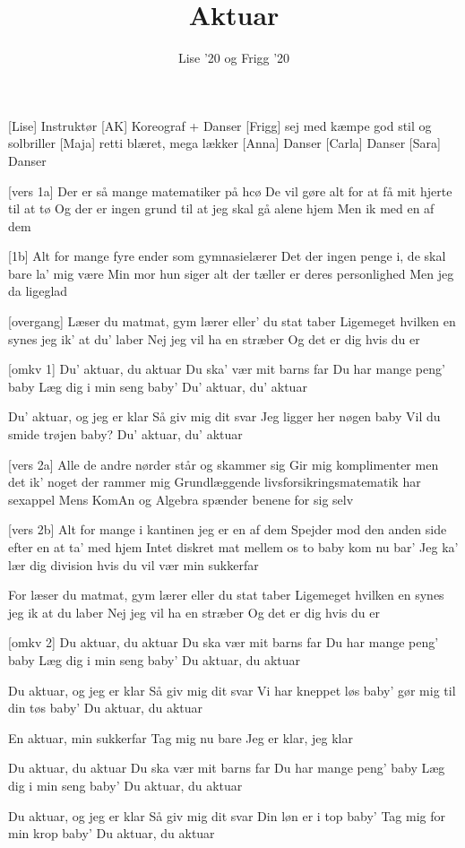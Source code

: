 \documentclass[a4paper,11pt]{article}
\title{Aktuar}
\author{Lise '20 og Frigg '20}
\begin{document}
\maketitle

\begin{roles}
[Lise] Instruktør
[AK] Koreograf + Danser
[Frigg] sej med kæmpe god stil og solbriller
[Maja] retti blæret, mega lækker
[Anna] Danser
[Carla] Danser
[Sara] Danser
\end{roles}



\begin{song}
[vers 1a]
Der er så mange matematiker på hcø
De vil gøre alt for at få mit hjerte til at tø
Og der er ingen grund til at jeg skal gå alene hjem
Men ik med en af dem

[1b]
Alt for mange fyre ender som gymnasielærer
Det der ingen penge i, de skal bare la’ mig være
Min mor hun siger alt der tæller er deres personlighed
Men jeg da ligeglad

[overgang]
Læser du matmat, gym lærer eller’ du stat taber
Ligemeget hvilken en synes jeg ik’ at du’ laber
Nej jeg vil ha en stræber
Og det er dig hvis du er

[omkv 1]
Du’ aktuar, du aktuar
Du ska’ vær mit barns far
Du har mange peng’ baby
Læg dig i min seng baby’
Du’ aktuar, du’ aktuar

Du’ aktuar, og jeg er klar
Så giv mig dit svar
Jeg ligger her nøgen baby
Vil du smide trøjen baby?
Du’ aktuar, du’ aktuar

[vers 2a]
Alle de andre nørder står og skammer sig
Gir mig komplimenter men det ik’ noget der rammer mig
Grundlæggende livsforsikringsmatematik har sexappel
Mens KomAn og Algebra spænder benene for sig selv

[vers 2b]
Alt for mange i kantinen jeg er en af dem
Spejder mod den anden side efter en at ta’ med hjem
Intet diskret mat mellem os to baby kom nu bar’
Jeg ka’ lær dig division hvis du vil vær min sukkerfar

For læser du matmat, gym lærer eller du stat taber
Ligemeget hvilken en synes jeg ik at du laber
Nej jeg vil ha en stræber
Og det er dig hvis du er

[omkv 2]
Du aktuar, du aktuar
Du ska vær mit barns far
Du har mange peng’ baby
Læg dig i min seng baby’
Du aktuar, du aktuar

Du aktuar, og jeg er klar
Så giv mig dit svar
Vi har kneppet løs baby’
gør mig til din tøs baby’
Du aktuar, du aktuar

En aktuar, min sukkerfar
Tag mig nu bare
Jeg er klar, jeg klar

Du aktuar, du aktuar
Du ska vær mit barns far
Du har mange peng’ baby
Læg dig i min seng baby’
Du aktuar, du aktuar

Du aktuar, og jeg er klar
Så giv mig dit svar
Din løn er i top baby’
Tag mig for min krop baby’
Du aktuar, du aktuar



\end{song}
\end{document}
